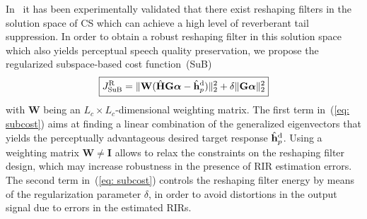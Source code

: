 \documentclass{article}
\begin{document}
In~\cite{Kodrasi_ITASLP_2013} it has been experimentally validated that there exist reshaping filters in the solution space of CS which can achieve a high level of reverberant tail suppression. 
In order to obtain a robust reshaping filter in this solution space which also yields perceptual speech quality preservation, we propose the regularized subspace-based cost function~(SuB) 
\begin{equation}
\label{eq: subcost}
\boxed{J_{\rm SuB}^{\rm R} = \|\mathbf{W}(\hat{\mathbf{H}}\mathbf{G}\boldsymbol \alpha - \hat{\mathbf{h}}_p^{\rm d})\|_2^2 + \delta \|\mathbf{G} \boldsymbol \alpha \|_2^2}
\end{equation}
with $\mathbf{W}$ being an $L_c \times L_c$-dimensional weighting matrix.
The first term in~(\ref{eq: subcost}) aims at finding a linear combination of the generalized eigenvectors that yields the perceptually advantageous desired target response $\hat{\mathbf{h}}_p^{\rm d}$.
Using a weighting matrix $\mathbf{W} \neq \mathbf{I}$ allows to relax the constraints on the reshaping filter design, which may increase robustness in the presence of RIR estimation errors.
The second term in~(\ref{eq: subcost}) controls the reshaping filter energy by means of the regularization parameter $\delta$, in order to avoid distortions in the output signal due to errors in the estimated RIRs.
\end{document}
